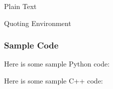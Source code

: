 \documentclass[aspectratio=1610]{beamer}
\begin{document}
\begin{frame}{Plain Text}
  \lipsum[1]
\end{frame}



\begin{frame}{Quoting Environment}
  \lipsum[3]
  \begin{quote}
    \lipsum[4]
  \end{quote}
\end{frame}



\begin{frame}
  \frametitle{Sample Code}

  Here is some sample Python code:
  

  Here is some sample C++ code:
  
\end{frame}



\begin{frame}
  \vspace{3em}
  \hspace{1em}\layout{}
\end{frame}
\end{document}

